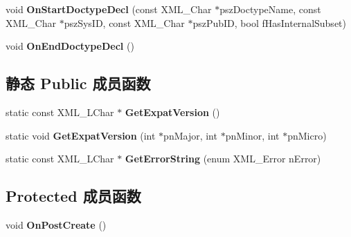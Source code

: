 \begin{DoxyCompactItemize}
\item 
\hypertarget{class_c_expat_impl_a98aee5e2d5b4e00b4808e3b6b6761872}{void {\bfseries On\+Start\+Doctype\+Decl} (const X\+M\+L\+\_\+\+Char $\ast$psz\+Doctype\+Name, const X\+M\+L\+\_\+\+Char $\ast$psz\+Sys\+I\+D, const X\+M\+L\+\_\+\+Char $\ast$psz\+Pub\+I\+D, bool f\+Has\+Internal\+Subset)}\label{class_c_expat_impl_a98aee5e2d5b4e00b4808e3b6b6761872}

\item 
\hypertarget{class_c_expat_impl_a395e6e654c41012cd3722d2445c174e3}{void {\bfseries On\+End\+Doctype\+Decl} ()}\label{class_c_expat_impl_a395e6e654c41012cd3722d2445c174e3}

\end{DoxyCompactItemize}
\subsection*{静态 Public 成员函数}
\begin{DoxyCompactItemize}
\item 
\hypertarget{class_c_expat_impl_aad3b5874db5b019fcd5fb370bb585463}{static const X\+M\+L\+\_\+\+L\+Char $\ast$ {\bfseries Get\+Expat\+Version} ()}\label{class_c_expat_impl_aad3b5874db5b019fcd5fb370bb585463}

\item 
\hypertarget{class_c_expat_impl_ac6bd3e8292fecc53dfd04038f851eb97}{static void {\bfseries Get\+Expat\+Version} (int $\ast$pn\+Major, int $\ast$pn\+Minor, int $\ast$pn\+Micro)}\label{class_c_expat_impl_ac6bd3e8292fecc53dfd04038f851eb97}

\item 
\hypertarget{class_c_expat_impl_a1e549012634630c0dc954cd6f15f25e5}{static const X\+M\+L\+\_\+\+L\+Char $\ast$ {\bfseries Get\+Error\+String} (enum X\+M\+L\+\_\+\+Error n\+Error)}\label{class_c_expat_impl_a1e549012634630c0dc954cd6f15f25e5}

\end{DoxyCompactItemize}
\subsection*{Protected 成员函数}
\begin{DoxyCompactItemize}
\item 
\hypertarget{class_c_expat_impl_a348eb163ca08ff99195a91e50c27ee2c}{void {\bfseries On\+Post\+Create} ()}\label{class_c_expat_impl_a348eb163ca08ff99195a91e50c27ee2c}

\end{DoxyCompactItemize}
